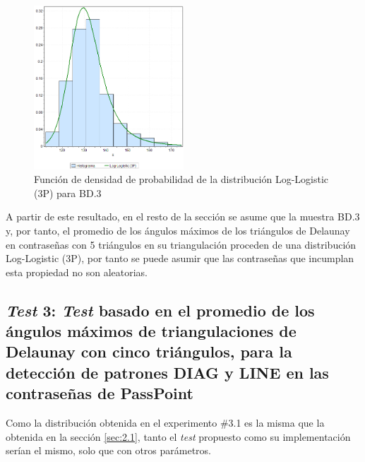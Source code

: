 \documentclass[12pt]{report}
\begin{document}
\begin{figure}[htbp]
	\centering
	
	\includegraphics[width=0.5\textwidth]{5td_fdp.png}
	\caption{Función de densidad de probabilidad de la  distribución Log-Logistic (3P) para BD.3}
	\label{5TD_FDP}
\end{figure}
 A partir de este resultado, en el resto de la sección se asume que la muestra  BD.3 y, por tanto, el promedio de los ángulos máximos de los triángulos de Delaunay en contraseñas con 5 triángulos en su triangulación  proceden de una distribución Log-Logistic (3P), por tanto se puede asumir que las contraseñas que incumplan esta propiedad no son aleatorias.
         



\subsection{\textit{Test} 3: \textit{Test} basado en el promedio de los ángulos máximos de triangulaciones de Delaunay con cinco triángulos, para la detección de patrones DIAG y LINE en las contraseñas de PassPoint}
\label{sec:3.2}

Como la distribución   obtenida en el experimento \#3.1 es la misma que la obtenida en la sección \ref{sec:2.1}, tanto el \textit{test} propuesto como su implementación  serían el mismo, solo que con otros parámetros.

\end{document}
